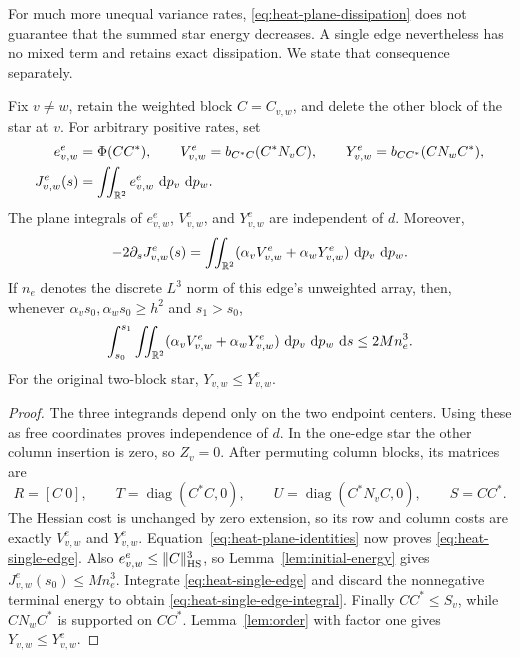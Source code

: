 For much more unequal variance rates,
\eqref{eq:heat-plane-dissipation} does not guarantee that the summed
star energy decreases.  A single edge nevertheless has no mixed term
and retains exact dissipation.  We state that consequence separately.

\begin{lemma}\label{lem:single-edge-energy}
Fix $v\ne w$, retain the weighted block $C=C_{v,w}$, and delete the
other block of the star at $v$.  For arbitrary positive rates, set
\[
 \begin{aligned}
 e^e_{v,w}&=\Phi(CC^*),\qquad
 V^e_{v,w}=b_{C^*C}(C^*N_vC),\qquad
 Y^e_{v,w}=b_{CC^*}(CN_wC^*),\\
 J^e_{v,w}(s)&=\iint_{\mathbb R^2}e^e_{v,w}\,\,\mathrm d p_v\,\,\mathrm d p_w.
 \end{aligned}
\]
The plane integrals of $e^e_{v,w}$, $V^e_{v,w}$, and $Y^e_{v,w}$ are
independent of $d$.
Moreover,
\begin{equation}\label{eq:heat-single-edge}
 -2\partial_sJ^e_{v,w}(s)
 =\iint_{\mathbb R^2}
      (\alpha_vV^e_{v,w}+\alpha_wY^e_{v,w})\,\,\mathrm d p_v\,\,\mathrm d p_w.
\end{equation}
If $n_e$ denotes the discrete $L^3$ norm of this edge's unweighted
array, then, whenever $\alpha_vs_0,\alpha_ws_0\ge h^2$ and $s_1>s_0$,
\begin{equation}\label{eq:heat-single-edge-integral}
 \int_{s_0}^{s_1}\iint_{\mathbb R^2}
      (\alpha_vV^e_{v,w}+\alpha_wY^e_{v,w})
          \,\,\mathrm d p_v\,\,\mathrm d p_w\,\,\mathrm d s
 \le2M n_e^3.
\end{equation}
For the original two-block star, $Y_{v,w}\le Y^e_{v,w}$.
\end{lemma}

\begin{proof}
The three integrands depend only on the two endpoint centers.
Using these as free coordinates proves independence of $d$.
In the one-edge star the other column insertion is zero, so $Z_v=0$.
After permuting column blocks, its matrices are
\[
 R=[C\ 0],\qquad T=\operatorname{diag}(C^*C,0),\qquad
 U=\operatorname{diag}(C^*N_vC,0),\qquad S=CC^*.
\]
The Hessian cost is unchanged by zero extension, so its row and column
costs are exactly $V^e_{v,w}$ and $Y^e_{v,w}$.
Equation~\eqref{eq:heat-plane-identities} now proves
\eqref{eq:heat-single-edge}.
Also $e^e_{v,w}\le\|C\|_{\mathrm{HS}}^3$, so
Lemma~\ref{lem:initial-energy} gives $J^e_{v,w}(s_0)\le M n_e^3$.
Integrate \eqref{eq:heat-single-edge} and discard the nonnegative
terminal energy to obtain \eqref{eq:heat-single-edge-integral}.
Finally $CC^*\le S_v$, while $CN_wC^*$ is supported on $CC^*$.
Lemma~\ref{lem:order} with factor one gives $Y_{v,w}\le Y^e_{v,w}$.
\end{proof}
